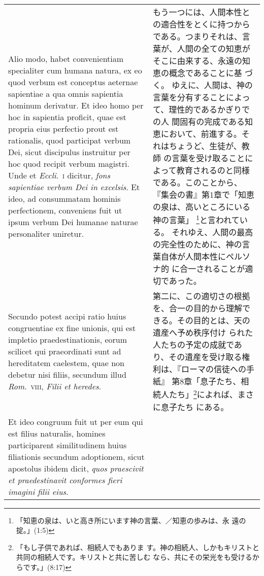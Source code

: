 \documentclass[10pt]{jsarticle} %
\begin{document}
\begin{longtable}{p{21em}p{21em}}
\\

Alio modo, habet convenientiam specialiter
cum humana natura, ex eo quod verbum est conceptus aeternae sapientiae a
qua omnis sapientia hominum derivatur. Et ideo homo per hoc in sapientia
proficit, quae est propria eius perfectio prout est rationalis, quod
participat verbum Dei, sicut discipulus instruitur per hoc quod recipit
verbum magistri. Unde et {\itshape Eccli}.~{\scshape i} dicitur, {\itshape fons sapientiae verbum Dei in
excelsis}. 
Et ideo, ad consummatam hominis perfectionem, conveniens fuit
ut ipsum verbum Dei humanae naturae personaliter uniretur. 

&

もう一つには、人間本性との適合性をとくに持つからである。つまりそれは、言
 葉が、人間の全ての知恵がそこに由来する、永遠の知恵の概念であることに基
 づく。
ゆえに、人間は、神の言葉を分有することによって、理性的であるかぎりでの人
 間固有の完成である知恵において、前進する。それはちょうど、生徒が、教師
 の言葉を受け取ることによって教育されるのと同様である。このことから、
 『集会の書』第1章で「知恵の泉は、高いところにいる神の言葉」
 \footnote{「知恵の泉は、いと高き所にいます神の言葉、／知恵の歩みは、永
 遠の掟。」(1:5) }と言われている。
それゆえ、人間の最高の完全性のために、神の言葉自体が人間本性にペルソナ的
 に合一されることが適切であった。


\\



Secundo
potest accipi ratio huius congruentiae ex fine unionis, qui est impletio
praedestinationis, eorum scilicet qui praeordinati sunt ad hereditatem
caelestem, quae non debetur nisi filiis, secundum illud {\itshape
 Rom}.~{\scshape viii}, {\itshape Filii et heredes}. 


&

第二に、この適切さの根拠を、合一の目的から理解できる。その目的とは、天の遺産へ予め秩序付け
 られた人たちの予定の成就であり、その遺産を受け取る権利は、『ローマの信徒への手紙』
 第8章「息子たち、相続人たち」\footnote{「もし子供であれば、相続人でもありま
 す。神の相続人、しかもキリストと共同の相続人です。キリストと共に苦しむ
 なら、共にその栄光をも受けるからです。」(8:17)}によれば、まさに息子たち
 にある。



\\

Et ideo congruum fuit ut per eum qui est filius naturalis,
homines participarent similitudinem huius filiationis secundum
adoptionem, sicut apostolus ibidem dicit, {\itshape quos praescivit et
praedestinavit conformes fieri imagini filii eius}. 


\end{longtable}
\end{document}
